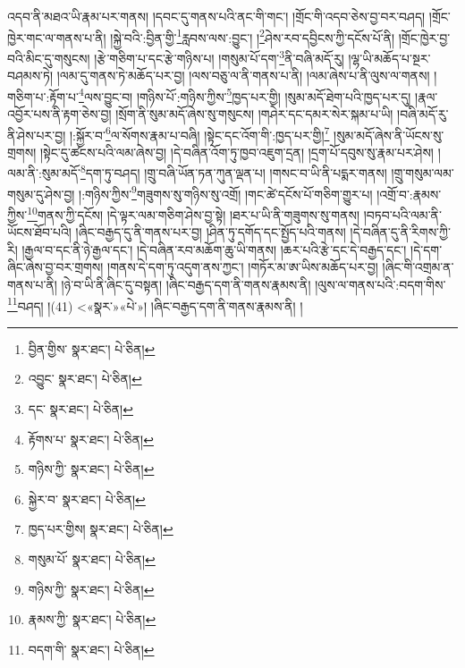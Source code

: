 འདབ་ནི་མཐའ་ཡི་རྣམ་པར་གནས། །དབང་དུ་གནས་པའི་ནང་གི་གང་། །གྲོང་གི་འདབ་ཅེས་བྱ་བར་བཤད། །གྲོང་ཁྱེར་གང་ལ་གནས་པ་ནི། །སྐྱེ་བའི་:བྱིན་གྱི་\footnote{བྱིན་གྱིས་  སྣར་ཐང་།  པེ་ཅིན། }རླབས་ལས་:བྱུང་། །\footnote{འབྱུང་  སྣར་ཐང་།  པེ་ཅིན། }ཤེས་རབ་དབྱིངས་ཀྱི་དངོས་པོ་ནི། །གྲོང་ཁྱེར་བྱ་བའི་མིང་དུ་གསུངས། །རྩེ་གཅིག་པ་དང་རྩེ་གཉིས་པ། །གསུམ་པོ་དག་\footnote{དང་  སྣར་ཐང་།  པེ་ཅིན། }ནི་བཞི་མདོ་རུ། །ལྷ་ཡི་མཆོད་པ་སྔར་བཤམས་ཏེ། །ལམ་དུ་གནས་ཏེ་མཆོད་པར་བྱ། །ལས་བཅུ་ལ་ནི་གནས་པ་ནི། །ལམ་ཞེས་པ་ནི་ལུས་ལ་གནས། །གཅིག་པ་:རྟོག་པ་\footnote{རྟོགས་པ་  སྣར་ཐང་།  པེ་ཅིན། }ལས་བྱུང་བ། །གཉིས་པོ་:གཉིས་ཀྱིས་\footnote{གཉིས་ཀྱི་  སྣར་ཐང་།  པེ་ཅིན། }ཁྱད་པར་གྱི། །སུམ་མདོ་ཐེག་པའི་ཁྱད་པར་དུ། །རྣལ་འབྱོར་པས་ནི་རྟག་ཅེས་བྱ། །སྲོག་ནི་སུམ་མདོ་ཞེས་སུ་གསུངས། །གཤེར་དང་དམར་སེར་སྐམ་པ་ཡི། །བཞི་མདོ་རུ་ནི་ཤེས་པར་བྱ། །:སྐྱོར་བ་\footnote{སྐྱེར་བ་  སྣར་ཐང་།  པེ་ཅིན། }ལ་སོགས་རྣམ་པ་བཞི། །སྟེང་དང་འོག་གི་:ཁྱད་པར་གྱི།\footnote{ཁྱད་པར་གྱིས།  སྣར་ཐང་།  པེ་ཅིན། } །སུམ་མདོ་ཞེས་ནི་ཡོངས་སུ་གྲགས། །སྟེང་དུ་ཚངས་པའི་ལམ་ཞེས་བྱ། །དེ་བཞིན་འོག་ཏུ་ཁྱབ་འཇུག་དྲན། །དྲག་པོ་དབུས་སུ་རྣམ་པར་ཤེས། །ལམ་ནི་:སུམ་མདོ་\footnote{གསུམ་པོ་  སྣར་ཐང་།  པེ་ཅིན། }དག་ཏུ་བཤད། །གྲུ་བཞི་ཡོན་ཏན་ཀུན་ལྡན་པ། །གསང་བ་ཡི་ནི་པདྨར་གནས། །གྲུ་གསུམ་ལམ་གསུམ་དུ་ཤེས་བྱ། །:གཉིས་ཀྱིས་\footnote{གཉིས་ཀྱི་  སྣར་ཐང་།  པེ་ཅིན། }གཟུགས་སུ་གཉིས་སུ་འགྲོ། །གང་ཚེ་དངོས་པོ་གཅིག་གྱུར་པ། །འགྲོ་བ་:རྣམས་ཀྱིས་\footnote{རྣམས་ཀྱི་  སྣར་ཐང་།  པེ་ཅིན། }གནས་ཀྱི་དངོས། །དེ་ལྟར་ལམ་གཅིག་ཤེས་བྱ་སྟེ། །ཐར་པ་ཡི་ནི་གཟུགས་སུ་གནས། །བཏབ་པའི་ལམ་ནི་ཡོངས་ཐོབ་པའི། །ཞིང་བརྒྱད་དུ་ནི་གནས་པར་བྱ། །ཤིན་ཏུ་དགོད་དང་སྤྱོད་པའི་གནས། །དེ་བཞིན་དུ་ནི་རིགས་ཀྱི་རི། །རྒྱལ་བ་དང་ནི་ཉེ་རྒྱལ་དང་། །དེ་བཞིན་རབ་མཆོག་ཆུ་ཡི་གནས། །ཆར་པའི་རྩེ་དང་དེ་བརྒྱད་དང་། །དེ་དག་ཞིང་ཞེས་བྱ་བར་གྲགས། །གནས་དེ་དག་ཏུ་འདུག་ནས་ཀྱང་། །གཏོར་མ་ཨ་ཡིས་མཆོད་པར་བྱ། །ཞིང་གི་འགྲམ་ན་གནས་པ་ནི། །ཉེ་བ་ཡི་ནི་ཞིང་དུ་བསྟན། །ཞིང་བརྒྱད་དག་ནི་གནས་རྣམས་ནི། །ལུས་ལ་གནས་པའི་:བདག་གིས་\footnote{བདག་གི་  སྣར་ཐང་།  པེ་ཅིན། }བཤད། །(41) <«སྣར་»«པེ་»། །ཞིང་བརྒྱད་དག་ནི་གནས་རྣམས་ནི། །
